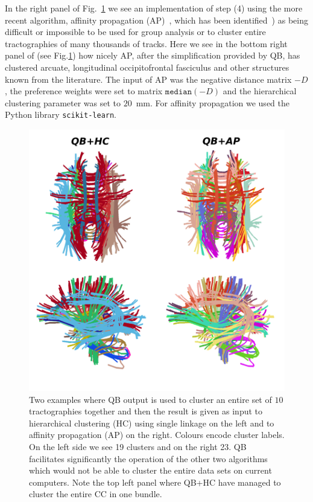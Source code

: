 \documentclass[journal]{IEEEtran}
\begin{document}
In the right panel of Fig.~\ref{Flo:LSC+HC+AP} we see an implementation
of step (4) using the more recent algorithm, affinity propagation
(AP)~\cite{dueck2009affinity}, which has been
identified~\cite{malcolm2009filtered}) as being difficult or impossible
to be used for group analysis or to cluster entire tractographies of
many thousands of tracks.
Here we see in the bottom right panel of (see Fig.\ref{Flo:LSC+HC+AP})
how nicely AP, after the simplification provided by QB, has clustered
arcuate, longitudinal occipitofrontal fasciculus and other structures
known from the literature. The input of AP was the negative distance
matrix $-D$, the preference weights were set to matrix $\mathtt{median}(-D)$
and the hierarchical clustering parameter was set to $20$~mm.
For affinity propagation we used the Python library \texttt{scikit-learn}.

\begin{figure}
\begin{centering}
\includegraphics[scale=0.6]{Fig_8_QB_with_others}
\par\end{centering}
\caption{Two examples where QB output is used to cluster an entire set
  of $10$ tractographies together and then the result is given as input
  to hierarchical clustering (HC) using single linkage on the left and
  to affinity propagation (AP) on the right. Colours encode cluster
  labels. On the left side we see 19 clusters and on the right 23. QB
  facilitates significantly the operation of the other two algorithms
  which would not be able to cluster the entire data sets on current
  computers. Note the top left panel where QB+HC have managed to cluster
  the entire CC in one bundle.\label{Flo:LSC+HC+AP}}
\end{figure}
\end{document}
